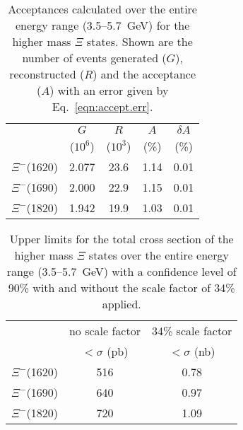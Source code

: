 \begin{table}[bhpt]\begin{center}
\caption[High Mass \texorpdfstring{$\Xi^-$}{Xi-} Acceptances]{\label{tab:high.xi.accept}Acceptances calculated over the entire energy range (3.5--5.7~GeV) for the higher mass $\Xi$ states. Shown are the number of events generated ($G$), reconstructed ($R$) and the acceptance ($A$) with an error given by Eq.~\ref{eqn:accept.err}.}
\begin{tabular}{ccccc}
\hline \hline
 & $G$ & $R$ & $A$ & $\delta A$ \\
 & ($10^6$) & ($10^3$) & (\%) & (\%) \\
\hline
$\Xi^-$(1620) & 2.077 & 23.6 & 1.14 & 0.01 \\
$\Xi^-$(1690) & 2.000 & 22.9 & 1.15 & 0.01 \\
$\Xi^-$(1820) & 1.942 & 19.9 & 1.03 & 0.01 \\
\hline \hline
\end{tabular}
\end{center}\end{table}

\begin{table}[bhpt]\begin{center}
\caption[High Mass \texorpdfstring{$\Xi^-$}{Xi-} Total Cross Section Upper Limits]{\label{tab:high.xi.ulimits}Upper limits for the total cross section of the higher mass $\Xi$ states over the entire energy range (3.5--5.7~GeV) with a confidence level of 90\% with and without the scale factor of 34\% applied.}
\begin{tabular}{ccc}
\hline \hline
 & no scale factor & 34\% scale factor \\
 & $<\sigma$ (pb) & $<\sigma$ (nb) \\
\hline
$\Xi^-$(1620) & 516 & 0.78 \\
$\Xi^-$(1690) & 640 & 0.97 \\
$\Xi^-$(1820) & 720 & 1.09 \\
\hline \hline
\end{tabular}
\end{center}\end{table}

\clearpage

